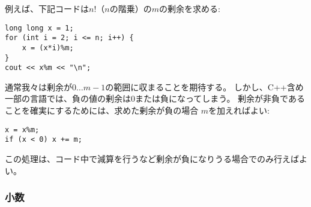 例えば、下記コードは$n!$（$n$の階乗）の$m$の剰余を求める:

\begin{lstlisting}
long long x = 1;
for (int i = 2; i <= n; i++) {
    x = (x*i)%m;
}
cout << x%m << "\n";
\end{lstlisting}

\begin{comment}
Usually we want the remainder to always
be between $0\ldots m-1$.
However, in C++ and other languages,
the remainder of a negative number
is either zero or negative.
An easy way to make sure there
are no negative remainders is to first calculate
the remainder as usual and then add $m$
if the result is negative:
\begin{lstlisting}
x = x%m;
if (x < 0) x += m;
\end{lstlisting}
However, this is only needed when there
are subtractions in the code and the
remainder may become negative.
\end{comment}

通常我々は剰余が$0\ldots m-1$の範囲に収まることを期待する。
しかし、C++含め一部の言語では、負の値の剰余は0または負になってしまう。
剰余が非負であることを確実にするためには、求めた剰余が負の場合
$m$を加えればよい:
\begin{lstlisting}
x = x%m;
if (x < 0) x += m;
\end{lstlisting}
この処理は、コード中で減算を行うなど剰余が負になりうる場合でのみ行えばよい。

\begin{comment}
\subsubsection{Floating point numbers}

\index{floating point number}
\end{comment}

\subsubsection{小数}



\begin{comment}
The usual floating point types in
competitive programming are
the 64-bit \texttt{double}
and, as an extension in the \texttt{g++} compiler,
the 80-bit \texttt{long double}.
In most cases, \texttt{double} is enough,
but \texttt{long double} is more accurate.

The required precision of the answer
is usually given in the problem statement.
An easy way to output the answer is to use
the \texttt{printf} function
and give the number of decimal places
in the formatting string.
For example, the following code prints
the value of $x$ with 9 decimal places:
\end{comment}

